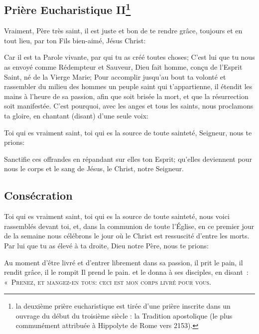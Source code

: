 
\subsection{Prière Eucharistique II\footnote{la deuxième prière eucharistique est tirée d’une prière inscrite 
dans un ouvrage du début du troisième siècle : la Tradition apostolique 
(le plus communément attribuée à Hippolyte de Rome vers 2153).}}\label{pe2}

Vraiment, Père très saint,
il est juste et bon de te rendre grâce,
toujours et en tout lieu,
par ton Fils bien-aimé, Jésus Christ:

Car il est ta Parole vivante,
par qui tu as créé toutes choses;
C'est lui que tu nous as envoyé
comme Rédempteur et Sauveur,
Dieu fait homme, conçu de l'Esprit Saint,
né de la Vierge Marie;
Pour accomplir jusqu'au bout ta volonté
et rassembler du milieu des hommes
un peuple saint qui t'appartienne,
il étendit les mains à l'heure de sa passion,
afin que soit brisée la mort,
et que la résurrection soit manifestée.
C'est pourquoi,
avec les anges et tous les saints,
nous proclamons ta gloire,
en chantant (disant) d'une seule voix:




Toi qui es vraiment saint,
toi qui es la source de toute sainteté,
Seigneur, nous te prions:


Sanctifie ces offrandes
en répandant sur elles ton Esprit; 
qu'elles deviennent pour nous 
le corps et le sang de Jésus, le Christ, notre Seigneur.

\subsection{Consécration}

Toi qui es vraiment saint,
toi qui es la source de toute sainteté,
nous voici rassemblés devant toi,
et, dans la communion de toute l'Église,
en ce premier jour de la semaine
nous célébrons le jour
où le Christ est ressuscité d'entre les morts.
Par lui que tu as élevé à ta droite,
Dieu notre Père, nous te prions:

Au moment d'être livré
et d'entrer librement dans sa passion,
il prit le pain, il rendit grâce, il le rompit Il prend le pain.
et le donna à ses disciples, en disant~:
\textsc{«~Prenez, et mangez-en tous:} 
\textsc{ceci est mon corps livré pour vous.~\fg}

